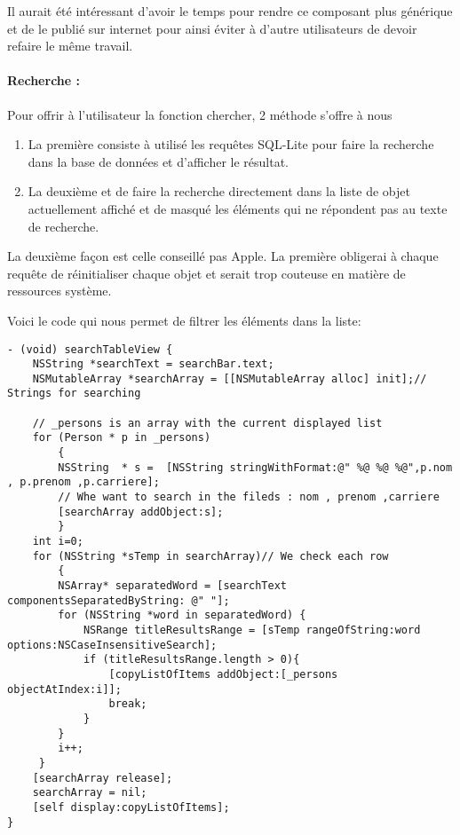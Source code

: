 					Il aurait été intéressant d'avoir le temps pour rendre ce composant plus générique et de le publié sur internet pour ainsi éviter à d'autre utilisateurs de  devoir refaire le même travail.
					
					\paragraph{Recherche :}Pour offrir à l'utilisateur la fonction chercher, 2 méthode s'offre à nous
					\begin{enumerate}
					\item La première consiste à utilisé les requêtes SQL-Lite pour faire la recherche dans la base de données et d'afficher le résultat.
					\item La deuxième et de faire la recherche directement dans la liste de objet actuellement affiché et de masqué les éléments qui ne répondent pas au texte de recherche.
					\end{enumerate} 
					La deuxième façon est celle conseillé pas Apple. La première obligerai à chaque requête de réinitialiser chaque objet et serait trop couteuse en matière de ressources système. 
					
					Voici le code qui nous permet de filtrer les éléments dans la liste:
	\lstset{
			    style = Xcode,
			    caption=Methode de recherche dans une UITableView.,
			    breaklines=true,
			    frame=single
			}

\begin{lstlisting}[name=Recherche dans UITableView  , label=searchTBV]
- (void) searchTableView {
	NSString *searchText = searchBar.text;
	NSMutableArray *searchArray = [[NSMutableArray alloc] init];// Strings for searching
	
	// _persons is an array with the current displayed list 
	for (Person * p in _persons)
        {
        NSString  * s =  [NSString stringWithFormat:@" %@ %@ %@",p.nom , p.prenom ,p.carriere];
        // Whe want to search in the fileds : nom , prenom ,carriere
		[searchArray addObject:s];
        }
	int i=0;
	for (NSString *sTemp in searchArray)// We check each row
        {
        NSArray* separatedWord = [searchText componentsSeparatedByString: @" "];
        for (NSString *word in separatedWord) {
            NSRange titleResultsRange = [sTemp rangeOfString:word options:NSCaseInsensitiveSearch];
            if (titleResultsRange.length > 0){
                [copyListOfItems addObject:[_persons objectAtIndex:i]];
                break;
            }
        }
        i++;
     }
	[searchArray release];
	searchArray = nil;
	[self display:copyListOfItems];
}
\end{lstlisting}
